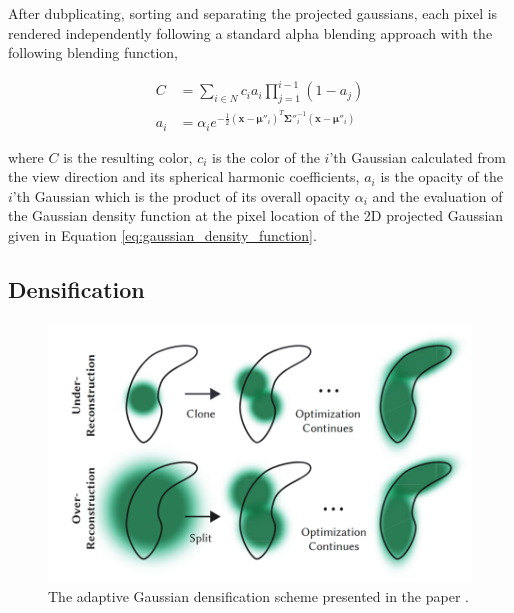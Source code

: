 After dubplicating, sorting and separating the projected gaussians, each pixel is rendered independently following a standard alpha blending approach with the following blending function,

\begin{align}
    C   & = \sum_{i \in N} c_i a_i \prod_{j=1}^{i-1} (1-a_j)                                           \\
    a_i & = \alpha_i e^{-\frac{1}{2}(\bm{x}-\bm{\mu}''_i)^T\bm{\Sigma''}_i^{-1} (\bm{x}-\bm{\mu}''_i)}
    \label{eq:alpha_blending}
\end{align}


where $C$ is the resulting color, $c_i$ is the color of the $i$'th Gaussian calculated from the view direction and its spherical harmonic coefficients, $a_i$ is the opacity of the $i$'th Gaussian which is the product of its overall opacity $\alpha_i$ and the evaluation of the Gaussian density function at the pixel location of the 2D projected Gaussian given in Equation \ref{eq:gaussian_density_function}.

\subsection{Densification}
\begin{figure}
    \centering
    \includegraphics[width=\linewidth]{images/densification.png}
    \caption{The adaptive Gaussian densification scheme presented in the paper \cite[Fig. 4]{kerbl3DGaussianSplatting2023}.}
\end{figure}
